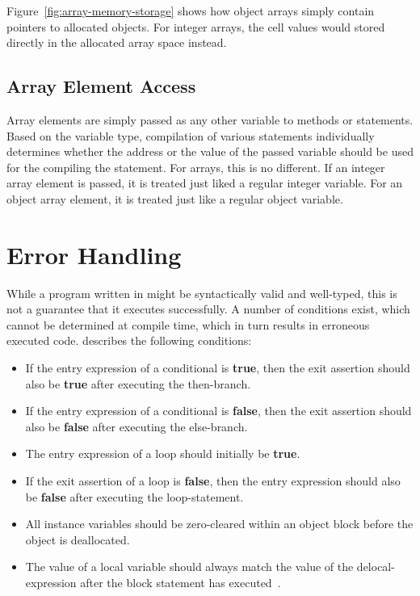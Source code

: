 Figure~\ref{fig:array-memory-storage} shows how object arrays simply contain pointers to allocated objects. For integer arrays, the cell values would stored directly in the allocated array space instead. 

\subsection{Array Element Access}
\label{subsec:array-element-access}
Array elements are simply passed as any other variable to methods or statements. Based on the variable type, compilation of various statements individually determines whether the address or the value of the passed variable should be used for the compiling the statement. For arrays, this is no different. If an integer array element is passed, it is treated just liked a regular integer variable. For an object array element, it is treated just like a regular object variable. 


\section{Error Handling}
\label{sec:error-handling}
While a program written in \rooplpp might be syntactically valid and well-typed, this is not a guarantee that it executes successfully. A number of conditions exist, which cannot be determined at compile time, which in turn results in erroneous executed code. \citeauthor{th:roopl} describes the following conditions:

\begin{itemize}
    \item If the entry expression of a conditional is \textbf{true}, then the exit assertion should also be \textbf{true} after executing the then-branch.
    \item If the entry expression of a conditional is \textbf{false}, then the exit assertion should also be \textbf{false} after executing the else-branch.
    \item The entry expression of a loop should initially be \textbf{true}.
    \item If the exit assertion of a loop is \textbf{false}, then the entry expression should also be \textbf{false} after executing the loop-statement.
    \item All instance variables should be zero-cleared within an object block before the object is deallocated.
    \item The value of a local variable should always match the value of the delocal-expression after the block statement has executed~\cite{th:roopl}.
\end{itemize}

